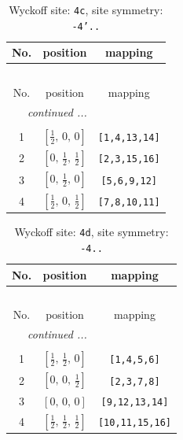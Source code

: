 \documentclass[fleqn,8pt]{jsarticle}
\begin{document}
\renewcommand{\arraystretch}{1.2}
\begin{longtable}{ccc}
\caption{Wyckoff site: {\tt 4c}, site symmetry: {\tt -4'..}}
 \\
 \hline \hline
No. & position & mapping \\ \hline \endfirsthead

\multicolumn{2}{l}{\tablename\ \thetable{}} \\
 \hline \hline
No. & position & mapping \\ \hline \endhead

 \hline \hline
\multicolumn{2}{r}{\footnotesize\it continued ...} \\ \endfoot

 \hline \hline
\multicolumn{2}{r}{} \\ \endlastfoot

1 & $\left[ \frac{1}{2},\, 0,\, 0 \right]$ & {\tt [1,4,13,14]} \\ \hline
2 & $\left[ 0,\, \frac{1}{2},\, \frac{1}{2} \right]$ & {\tt [2,3,15,16]} \\ \hline
3 & $\left[ 0,\, \frac{1}{2},\, 0 \right]$ & {\tt [5,6,9,12]} \\ \hline
4 & $\left[ \frac{1}{2},\, 0,\, \frac{1}{2} \right]$ & {\tt [7,8,10,11]} \\
\end{longtable}
\renewcommand{\arraystretch}{1.2}
\begin{longtable}{ccc}
\caption{Wyckoff site: {\tt 4d}, site symmetry: {\tt -4..}}
 \\
 \hline \hline
No. & position & mapping \\ \hline \endfirsthead

\multicolumn{2}{l}{\tablename\ \thetable{}} \\
 \hline \hline
No. & position & mapping \\ \hline \endhead

 \hline \hline
\multicolumn{2}{r}{\footnotesize\it continued ...} \\ \endfoot

 \hline \hline
\multicolumn{2}{r}{} \\ \endlastfoot

1 & $\left[ \frac{1}{2},\, \frac{1}{2},\, 0 \right]$ & {\tt [1,4,5,6]} \\ \hline
2 & $\left[ 0,\, 0,\, \frac{1}{2} \right]$ & {\tt [2,3,7,8]} \\ \hline
3 & $\left[ 0,\, 0,\, 0 \right]$ & {\tt [9,12,13,14]} \\ \hline
4 & $\left[ \frac{1}{2},\, \frac{1}{2},\, \frac{1}{2} \right]$ & {\tt [10,11,15,16]} \\
\end{longtable}
\end{document}
